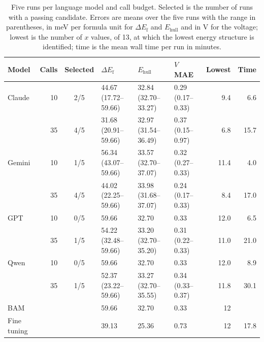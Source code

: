 \begin{table}[h]
\caption{Five runs per language model and call budget. Selected is the number of runs with a passing candidate. Errors are means over the five runs with the range in parentheses, in meV per formula unit for $\Delta E_\mathrm{f}$ and $E_{\mathrm{hull}}$ and in V for the voltage; lowest is the number of $x$ values, of 13, at which the lowest energy structure is identified; time is the mean wall time per run in minutes.}
\label{tab:si-p2runs}
\centering
\footnotesize
\renewcommand{\baselinestretch}{1}\selectfont
\setlength{\tabcolsep}{3pt}
\begin{tabular}{lrclllrr}
\toprule
Model & Calls & Selected & $\Delta E_\mathrm{f}$ & $E_{\mathrm{hull}}$ & $V$ MAE & Lowest & Time \\
\midrule
Claude & 10 & 2/5 & 44.67 (17.72--59.66) & 32.84 (32.70--33.27) & 0.29 (0.17--0.33) & 9.4 & 6.6 \\
 & 35 & 4/5 & 31.68 (20.91--59.66) & 32.97 (31.54--36.49) & 0.37 (0.15--0.97) & 6.8 & 15.7 \\
Gemini & 10 & 1/5 & 56.34 (43.07--59.66) & 33.57 (32.70--37.07) & 0.32 (0.27--0.33) & 11.4 & 4.0 \\
 & 35 & 4/5 & 44.02 (22.25--59.66) & 33.98 (31.68--37.07) & 0.24 (0.17--0.33) & 8.4 & 17.0 \\
GPT & 10 & 0/5 & 59.66 & 32.70 & 0.33 & 12.0 & 6.5 \\
 & 35 & 1/5 & 54.22 (32.48--59.66) & 33.20 (32.70--35.20) & 0.31 (0.22--0.33) & 11.0 & 21.0 \\
Qwen & 10 & 0/5 & 59.66 & 32.70 & 0.33 & 12.0 & 8.9 \\
 & 35 & 1/5 & 52.37 (23.22--59.66) & 33.27 (32.70--35.55) & 0.34 (0.33--0.37) & 11.8 & 30.1 \\
\midrule
BAM & & & 59.66 & 32.70 & 0.33 & 12 & \\
Fine tuning & & & 39.13 & 25.36 & 0.73 & 12 & 17.8 \\
\bottomrule
\end{tabular}
\end{table}

